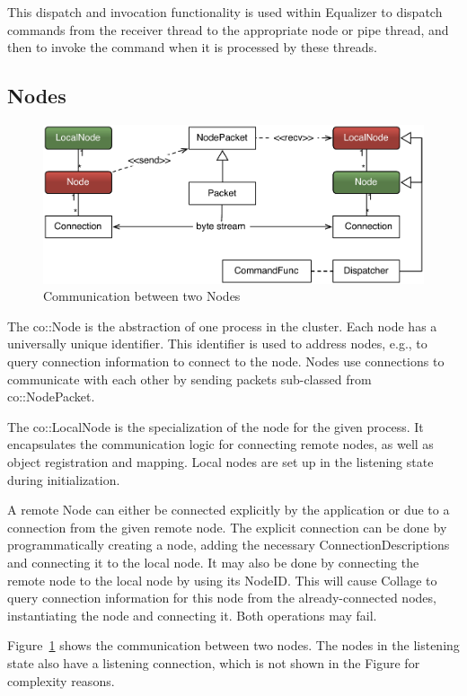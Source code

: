 \documentclass[10pt,a4]{scrartcl}
\newcommand{\fig}[1]{Figure~\ref{#1}}
\begin{document}
This dispatch and invocation functionality is used within Equalizer to
dispatch commands from the receiver thread to the appropriate node or
pipe thread, and then to invoke the command when it is processed by
these threads.

\subsection{Nodes}

\begin{figure}
  \includegraphics[width=.618\textwidth]{images/netNode.pdf}
  {\caption{\label{fNetNode}Communication between two Nodes}}
\end{figure}
The \textsf{co::Node} is the abstraction of one process in the cluster. Each
node has a universally unique identifier. This identifier is used to address
nodes, e.g., to query connection information to connect to the node. Nodes use
connections to communicate with each other by sending packets sub-classed from
\textsf{co::NodePacket}.

The \textsf{co::LocalNode} is the specialization of the node for the given
process. It encapsulates the communication logic for connecting remote nodes, as
well as object registration and mapping. Local nodes are set up in the listening
state during initialization.

A remote \textsf{Node} can either be connected explicitly by the application or
due to a connection from the given remote node. The explicit connection can be
done by programmatically creating a node, adding the necessary
\textsf{ConnectionDescription}s and connecting it to the local node. It may also
be done by connecting the remote node to the local node by using its
\textsf{NodeID}. This will cause Collage to query connection information for
this node from the already-connected nodes, instantiating the node and
connecting it. Both operations may fail.

\fig{fNetNode} shows the communication between two nodes. The nodes in
the listening state also have a listening connection, which is not shown
in the Figure for complexity reasons.
\end{document}
